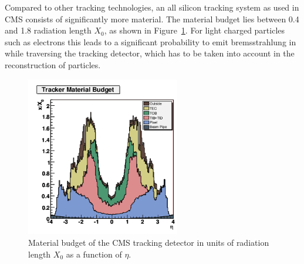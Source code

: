 Compared to other tracking technologies, an all silicon tracking system as used in CMS consists of significantly more material. The material budget lies between 0.4 and 1.8 radiation length $X_0$, as shown in Figure~\ref{fig:trackerMaterial}. For light charged particles such as electrons this leads to a significant probability to emit bremsstrahlung in while traversing the tracking detector, which has to be taken into account in the reconstruction of particles.    
\begin{figure}[htbp]
\centering
  \includegraphics[width=0.6\textwidth]{plots/CMS/TrackerMaterial.png}
\caption{Material budget of the CMS tracking detector in units of radiation length $X_0$ as a function of $\eta$.}
\label{fig:trackerMaterial}
\end{figure} 
